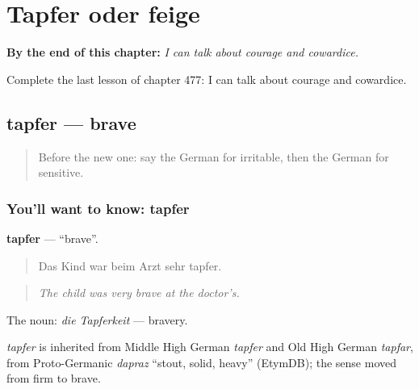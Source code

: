 
\chapter{Tapfer oder feige}
\label{ch:ge-tapfer-oder-feige}

\begin{chapteropening}
\textbf{By the end of this chapter:} \emph{I can talk about courage and cowardice.}

Complete the last lesson of chapter 477: I can talk about courage and cowardice.
\end{chapteropening}

\section[tapfer]{tapfer — brave}

\label{lesson:GE-C477-tapfer}



\begin{quote}
Before the new one: say the German for irritable, then the German for sensitive.
\end{quote}

\subsection*{You'll want to know: tapfer}
\textbf{tapfer} — \textquotedblleft{}brave\textquotedblright{}.

\begin{quote}
Das Kind war beim Arzt sehr tapfer.
\end{quote}

\begin{quote}
\emph{The child was very brave at the doctor's.}
\end{quote}

The noun: \emph{die Tapferkeit} — bravery.

\begin{cousinweb}
\emph{tapfer} is inherited from Middle High German \emph{tapfer} and Old High German \emph{tapfar}, from Proto-Germanic \emph{dapraz} \textquotedblleft{}stout, solid, heavy\textquotedblright{} (EtymDB); the sense moved from firm to brave.
\end{cousinweb}

